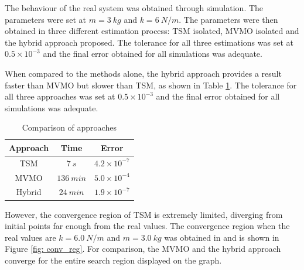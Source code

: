 The behaviour of the real system was obtained through simulation. The parameters were set at $m = 3\ kg$ and $k = 6\ N/m$. The parameters were then obtained in three different estimation process: TSM isolated, MVMO isolated and the hybrid approach proposed. The tolerance for all three estimations was set at $0.5 \times 10^{-3}$ and the final error obtained for all simulations was adequate.



When compared to the methods alone, the hybrid approach provides a result faster than MVMO but slower than TSM, as shown in Table \ref{tab: SM}. The tolerance for all three approaches was set at $0.5 \times 10^{-3}$ and the final error obtained for all simulations was adequate.

\begin{table}[]
	\caption{Comparison of approaches}
	\begin{center}
	\begin{tabular}{c|c|c}
		Approach & Time & Error \\
		\hline
		TSM  & $7 \ s$  & $4.2\times 10^{-7}$ \\
		MVMO  & $136 \ min$  & $5.0\times 10^{-4}$\\
		Hybrid  & $24 \ min$  & $1.9\times 10^{-7}$
	\end{tabular}
	\end{center}
	\label{tab: SM}
\end{table}

However, the convergence region of TSM is extremely limited, diverging from initial points far enough from the real values. The convergence region when the real values are $k = 6.0 \ N/m$ and $m = 3.0 \ kg$ was obtained in \cite{Ecyo} and is shown in Figure \ref{fig: conv_reg}. For comparison, the MVMO and the hybrid approach converge for the entire search region displayed on the graph.

